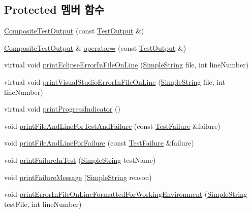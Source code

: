 \subsection*{Protected 멤버 함수}
\begin{DoxyCompactItemize}
\item 
\hyperlink{class_composite_test_output_a868b2232913eb1879c28de3ce70d205b}{Composite\+Test\+Output} (const \hyperlink{class_test_output}{Test\+Output} \&)
\item 
\hyperlink{class_composite_test_output}{Composite\+Test\+Output} \& \hyperlink{class_composite_test_output_a1a340fa902faa3ddda6b4bf03d8499f4}{operator=} (const \hyperlink{class_test_output}{Test\+Output} \&)
\item 
virtual void \hyperlink{class_test_output_aa2b6f28b76a53cac4059991bc3c86f79}{print\+Eclipse\+Error\+In\+File\+On\+Line} (\hyperlink{class_simple_string}{Simple\+String} file, int line\+Number)
\item 
virtual void \hyperlink{class_test_output_a0a0136e850e6b9a696ab84e5c416341a}{print\+Visual\+Studio\+Error\+In\+File\+On\+Line} (\hyperlink{class_simple_string}{Simple\+String} file, int line\+Number)
\item 
virtual void \hyperlink{class_test_output_a0cd44d3b6da1caa7b8d335ef7580a391}{print\+Progress\+Indicator} ()
\item 
void \hyperlink{class_test_output_ae20c439e68036cc705a86d9a95954168}{print\+File\+And\+Line\+For\+Test\+And\+Failure} (const \hyperlink{class_test_failure}{Test\+Failure} \&failure)
\item 
void \hyperlink{class_test_output_a1d78706f5181a464f5fafb178d231be9}{print\+File\+And\+Line\+For\+Failure} (const \hyperlink{class_test_failure}{Test\+Failure} \&failure)
\item 
void \hyperlink{class_test_output_a1748d410d65b95596df95234742258a3}{print\+Failure\+In\+Test} (\hyperlink{class_simple_string}{Simple\+String} test\+Name)
\item 
void \hyperlink{class_test_output_ab13cdfa930cc1ad29b36b1ab7ff77a99}{print\+Failure\+Message} (\hyperlink{class_simple_string}{Simple\+String} reason)
\item 
void \hyperlink{class_test_output_a56ae5964123fc91c7149a8274aa22db9}{print\+Error\+In\+File\+On\+Line\+Formatted\+For\+Working\+Environment} (\hyperlink{class_simple_string}{Simple\+String} test\+File, int line\+Number)
\end{DoxyCompactItemize}
